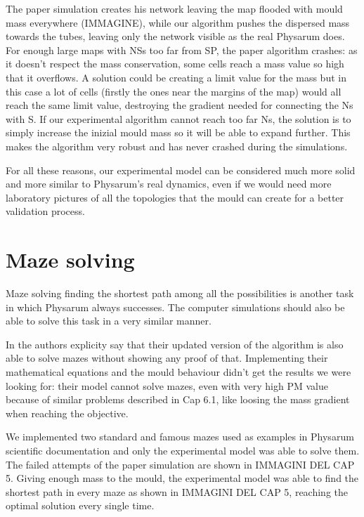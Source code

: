 \par
The paper simulation creates his network leaving the map flooded with mould mass everywhere (IMMAGINE), while our algorithm pushes the dispersed mass towards the tubes, leaving only the network visible as the real Physarum does. For enough large maps with NSs too far from SP, the paper algorithm crashes: as it doesn't respect the mass conservation, some cells reach a mass value so high that it overflows. A solution could be creating a limit value for the mass but in this case a lot of cells (firstly the ones near the margins of the map) would all reach the same limit value, destroying the gradient needed for connecting the Ns with S.
If our experimental algorithm cannot reach too far Ns, the solution is to simply increase the inizial mould mass so it will be able to expand further. This makes the algorithm very robust and has never crashed during the simulations.

\par
For all these reasons, our experimental model can be considered much more solid and more similar to Physarum's real dynamics, even if we would need more laboratory pictures of all the topologies that the mould can create for a better validation process.

\section{Maze solving}

Maze solving finding the shortest path among all the possibilities is another task in which Physarum always successes. The computer simulations should also be able to solve this task in a very similar manner.

\par
In \cite{Tsompanas2016} the authors explicity say that their updated version of the algorithm is also able to solve mazes without showing any proof of that. Implementing their mathematical equations and the mould behaviour didn't get the results we were looking for: their model cannot solve mazes, even with very high PM value because of similar problems described in Cap 6.1, like loosing the mass gradient when reaching the objective.

\par
We implemented two standard and famous mazes used as examples in Physarum scientific documentation and only the experimental model was able to solve them. The failed attempts of the paper simulation are shown in IMMAGINI DEL CAP 5.
Giving enough mass to the mould, the experimental model was able to find the shortest path in every maze as shown in IMMAGINI DEL CAP 5, reaching the optimal solution every single time.

